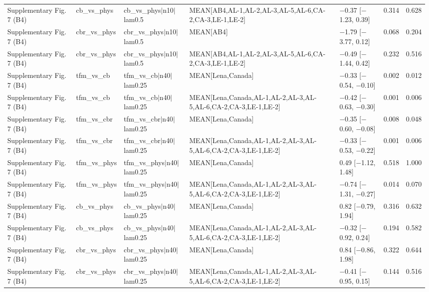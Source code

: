 \begin{longtable}{lllllrr}
Supplementary Fig. 7 (B4) & cb\_vs\_phys & cb\_vs\_phys$|$n10$|$lam0.5 & MEAN[AB4,AL-1,AL-2,AL-3,AL-5,AL-6,CA-2,CA-3,LE-1,LE-2] & $-$0.37 [$-$1.23, 0.39] & 0.314 & 0.628 \\
Supplementary Fig. 7 (B4) & cbr\_vs\_phys & cbr\_vs\_phys$|$n10$|$lam0.5 & MEAN[AB4] & $-$1.79 [$-$3.77, 0.12] & 0.068 & 0.204 \\
Supplementary Fig. 7 (B4) & cbr\_vs\_phys & cbr\_vs\_phys$|$n10$|$lam0.5 & MEAN[AB4,AL-1,AL-2,AL-3,AL-5,AL-6,CA-2,CA-3,LE-1,LE-2] & $-$0.49 [$-$1.44, 0.42] & 0.232 & 0.516 \\
Supplementary Fig. 7 (B4) & tfm\_vs\_cb & tfm\_vs\_cb$|$n40$|$lam0.25 & MEAN[Lena,Canada] & $-$0.33 [$-$0.54, $-$0.10] & 0.002 & 0.012 \\
Supplementary Fig. 7 (B4) & tfm\_vs\_cb & tfm\_vs\_cb$|$n40$|$lam0.25 & MEAN[Lena,Canada,AL-1,AL-2,AL-3,AL-5,AL-6,CA-2,CA-3,LE-1,LE-2] & $-$0.42 [$-$0.63, $-$0.30] & 0.001 & 0.006 \\
Supplementary Fig. 7 (B4) & tfm\_vs\_cbr & tfm\_vs\_cbr$|$n40$|$lam0.25 & MEAN[Lena,Canada] & $-$0.35 [$-$0.60, $-$0.08] & 0.008 & 0.048 \\
Supplementary Fig. 7 (B4) & tfm\_vs\_cbr & tfm\_vs\_cbr$|$n40$|$lam0.25 & MEAN[Lena,Canada,AL-1,AL-2,AL-3,AL-5,AL-6,CA-2,CA-3,LE-1,LE-2] & $-$0.33 [$-$0.53, $-$0.22] & 0.001 & 0.006 \\
Supplementary Fig. 7 (B4) & tfm\_vs\_phys & tfm\_vs\_phys$|$n40$|$lam0.25 & MEAN[Lena,Canada] & 0.49 [$-$1.12, 1.48] & 0.518 & 1.000 \\
Supplementary Fig. 7 (B4) & tfm\_vs\_phys & tfm\_vs\_phys$|$n40$|$lam0.25 & MEAN[Lena,Canada,AL-1,AL-2,AL-3,AL-5,AL-6,CA-2,CA-3,LE-1,LE-2] & $-$0.74 [$-$1.31, $-$0.27] & 0.014 & 0.070 \\
Supplementary Fig. 7 (B4) & cb\_vs\_phys & cb\_vs\_phys$|$n40$|$lam0.25 & MEAN[Lena,Canada] & 0.82 [$-$0.79, 1.94] & 0.316 & 0.632 \\
Supplementary Fig. 7 (B4) & cb\_vs\_phys & cb\_vs\_phys$|$n40$|$lam0.25 & MEAN[Lena,Canada,AL-1,AL-2,AL-3,AL-5,AL-6,CA-2,CA-3,LE-1,LE-2] & $-$0.32 [$-$0.92, 0.24] & 0.194 & 0.582 \\
Supplementary Fig. 7 (B4) & cbr\_vs\_phys & cbr\_vs\_phys$|$n40$|$lam0.25 & MEAN[Lena,Canada] & 0.84 [$-$0.86, 1.98] & 0.322 & 0.644 \\
Supplementary Fig. 7 (B4) & cbr\_vs\_phys & cbr\_vs\_phys$|$n40$|$lam0.25 & MEAN[Lena,Canada,AL-1,AL-2,AL-3,AL-5,AL-6,CA-2,CA-3,LE-1,LE-2] & $-$0.41 [$-$0.95, 0.15] & 0.144 & 0.516 \\

\end{longtable}
